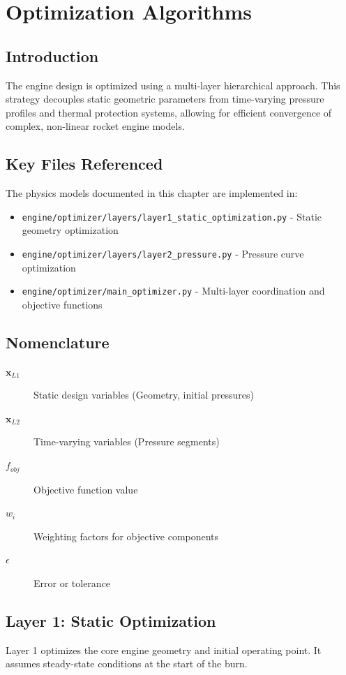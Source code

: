 \section{Optimization Algorithms}

\subsection{Introduction}
The engine design is optimized using a multi-layer hierarchical approach. This strategy decouples static geometric parameters from time-varying pressure profiles and thermal protection systems, allowing for efficient convergence of complex, non-linear rocket engine models.

\subsection{Key Files Referenced}
The physics models documented in this chapter are implemented in:
\begin{itemize}
    \item \texttt{engine/optimizer/layers/layer1_static_optimization.py} - Static geometry optimization
    \item \texttt{engine/optimizer/layers/layer2_pressure.py} - Pressure curve optimization
    \item \texttt{engine/optimizer/main_optimizer.py} - Multi-layer coordination and objective functions
\end{itemize}

\subsection{Nomenclature}
\begin{description}
    \item[$\mathbf{x}_{L1}$] Static design variables (Geometry, initial pressures)
    \item[$\mathbf{x}_{L2}$] Time-varying variables (Pressure segments)
    \item[$f_{obj}$] Objective function value
    \item[$w_i$] Weighting factors for objective components
    \item[$\epsilon$] Error or tolerance
\end{description}

\subsection{Layer 1: Static Optimization}
Layer 1 optimizes the core engine geometry and initial operating point. It assumes steady-state conditions at the start of the burn.

